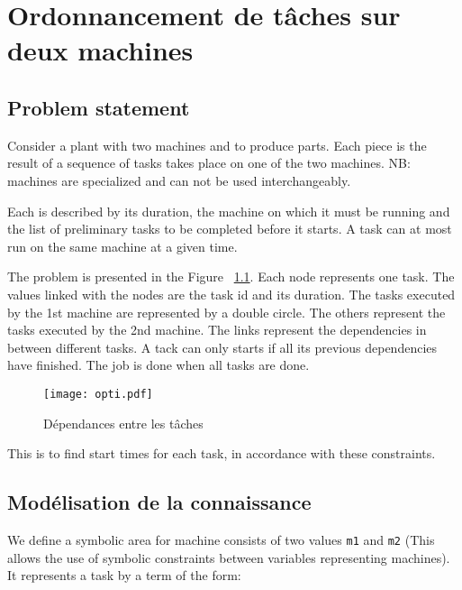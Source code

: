 \chapter{Ordonnancement de tâches sur deux machines}


\section{Problem statement}
\label{sec:enonce-du-probleme}

Consider a plant with two machines and to produce
parts. Each piece is the result of a sequence of tasks
takes place on one of the two machines. NB: machines are
specialized and can not be used interchangeably.


Each is described by its duration, the machine on which it
must be running and the list of preliminary tasks to be
completed before it starts. A task can at most
run on the same machine at a given time.

The problem is presented in the Figure ~\ref{opti}. Each node
represents one task. The values linked with the nodes are the task id and its duration. The tasks executed by the 1st machine are represented by a double circle. The others represent the tasks executed by the 2nd machine. The links represent the dependencies in between different tasks. A tack can only starts if all its previous dependencies have finished. The job is done when all tasks are done.

\begin{figure}
\begin{center}
\texttt{[image: opti.pdf]}
\caption{Dépendances entre les tâches}
\label{opti}
\end{center}
\end{figure}

This is to find start times for each task, in accordance with these constraints.
\section{Modélisation de la connaissance}
\label{sec:modelisation-connaissance}
We define a symbolic area for machine consists of two
values \verb|m1| and \verb|m2| (This allows the use of
symbolic constraints between variables representing
machines).
It represents a task by a term of the form:

